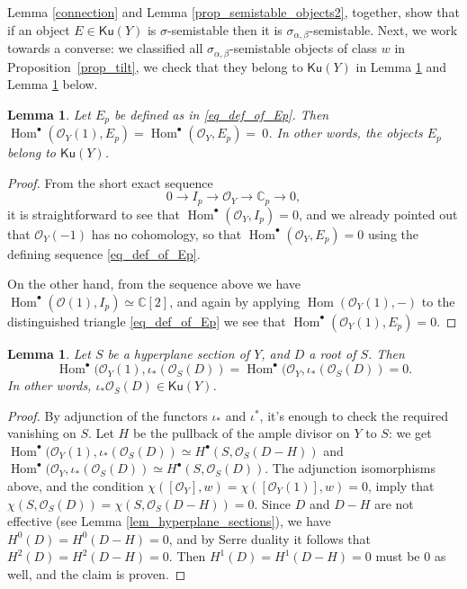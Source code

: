 \documentclass[11pt]{amsart}
\newtheorem{lemma}[thm]{Lemma}
\theoremstyle{definition}
\newcommand{\C}{\mathbb{C}}
\DeclareMathOperator{\Hom}{Hom}
\newcommand{\sO}{\mathcal{O}}
\newcommand{\AAA}[1]{\textcolor{red}{#1}}
\newcommand{\Ku}{\mathsf{Ku}}
\begin{document}
Lemma \ref{connection} and Lemma \ref{prop_semistable_objects2}, together, show that if an object $E\in \Ku(Y)$ is $\sigma$-semistable then it is $\sigma_{\alpha,\beta}$-semistable. Next, we work towards a converse: we classified all $\sigma_{\alpha,\beta}$-semistable objects of class $w$ in Proposition~\ref{prop_tilt}, we check that they belong to $\Ku(Y)$ in Lemma \ref{ep} and Lemma \ref{osd} below.




\begin{lemma} \label{ep}
Let $E_p$ be defined as in \eqref{eq_def_of_Ep}. Then $\Hom^\bullet(\sO_Y(1),E_p)=\Hom^\bullet(\sO_Y,E_p)=~0$. In other words,
the objects $E_p$ belong to $\Ku(Y)$.
\end{lemma}
\begin{proof}From the short exact sequence
\[
0 \to I_p\to \sO_Y \to \C_p \to 0,
\]
it is straightforward to see that $\Hom^\bullet(\sO_Y,I_p)=0$, and we already pointed out that $\sO_Y(-1)$ has no cohomology, so that $\Hom^\bullet(\sO_Y,E_p)=0$ using the defining sequence \eqref{eq_def_of_Ep}.

On the other hand, from the sequence above we have $\Hom^\bullet(\sO(1),I_p)\simeq \C[2]$, and again by applying $\Hom(\sO_Y(1),-)$ to the distinguished triangle \eqref{eq_def_of_Ep}  we see that $\Hom^\bullet(\sO_Y(1),E_p)=0$.
\end{proof}

\begin{lemma} \label{osd}
Let $S$ be a hyperplane section of $Y$, and $D$ a root of $S$. Then $$\Hom^\bullet(\sO_Y(1), \iota_*(\sO_S(D))=\Hom^\bullet(\sO_Y, \iota_*(\sO_S(D))=0.$$ In other words, $\iota_*\sO_S(D)\in \Ku(Y)$.
\end{lemma}
\begin{proof}
By adjunction of the functors $\iota_*$ and $\iota^*$, it's enough to check the required vanishing on $S$.
Let $H$ be the pullback of the ample divisor on $Y$ to $S$: we get $\Hom^\bullet(\sO_Y(1), \iota_*(\sO_S(D))\simeq H^\bullet(S,\sO_S(D-H))$ and $\Hom^\bullet(\sO_Y, \iota_*(\sO_S(D))\simeq H^\bullet(S,\sO_S(D))$.
The adjunction isomorphisms above, and the condition $\chi([\sO_Y],w)=\chi([\sO_Y(1)],w)=0$, imply that $\chi(S,\sO_S(D))=\chi(S,\sO_S(D-H))=0$. Since $D$ and $D-H$ are not effective (see Lemma \ref{lem_hyperplane_sections}), we have $H^0(D)=H^0(D-H)=0$, and by Serre duality it follows that $H^2(D)=H^2(D-H)=0$. Then $H^1(D)=H^1(D-H)=0$ must be $0$ as well, and the claim is proven.
\end{proof}
\end{document}
